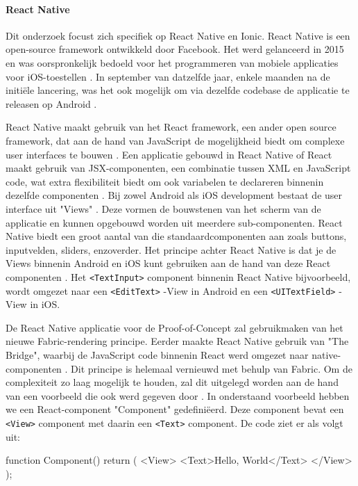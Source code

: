 \paragraph{React Native}

Dit onderzoek focust zich specifiek op React Native en Ionic. React Native is een open-source framework ontwikkeld door Facebook. Het werd gelanceerd in 2015 en was oorspronkelijk bedoeld voor het programmeren van mobiele applicaties voor iOS-toestellen \autocite{Bron2, Bron1}. In september van datzelfde jaar, enkele maanden na de initiële lancering, was het ook mogelijk om via dezelfde codebase de applicatie te releasen op Android \autocite{Bron1}.

React Native maakt gebruik van het React framework, een ander open source framework, dat aan de hand van JavaScript de mogelijkheid biedt om complexe user interfaces te bouwen \autocite{Bron17}. Een applicatie gebouwd in React Native of React maakt gebruik van JSX-componenten, een combinatie tussen XML en JavaScript code, wat extra flexibiliteit biedt om ook variabelen te declareren binnenin dezelfde componenten \autocite{Bron2}. Bij zowel Android als iOS development bestaat de user interface uit "Views" \autocite{Bron18}. Deze vormen de bouwstenen van het scherm van de applicatie en kunnen opgebouwd worden uit meerdere sub-componenten. React Native biedt een groot aantal van die standaardcomponenten aan zoals buttons, inputvelden, sliders, enzoverder. Het principe achter React Native is dat je de Views binnenin Android en iOS kunt gebruiken aan de hand van deze React componenten \autocite{Bron18}. Het \verb|<TextInput>| component binnenin React Native bijvoorbeeld, wordt omgezet naar een \verb|<EditText>| -View in Android en een \verb|<UITextField>| -View in iOS.

De React Native applicatie voor de Proof-of-Concept zal gebruikmaken van het nieuwe Fabric-rendering principe. Eerder maakte React Native gebruik van "The Bridge", waarbij de JavaScript code binnenin React werd omgezet naar native-componenten \autocite{Bron1}. Dit principe is helemaal vernieuwd met behulp van Fabric. Om de complexiteit zo laag mogelijk te houden, zal dit uitgelegd worden aan de hand van een voorbeeld die ook werd gegeven door \autocite{Bron17}. In onderstaand voorbeeld hebben we een React-component "Component" gedefiniëerd. Deze component bevat een \verb|<View>| component met daarin een \verb|<Text>| component. De code ziet er als volgt uit:

\begin{LVerbatim}
function Component() {
  return (
    <View>
      <Text>Hello, World</Text>
    </View>
  );
}
\end{LVerbatim}

